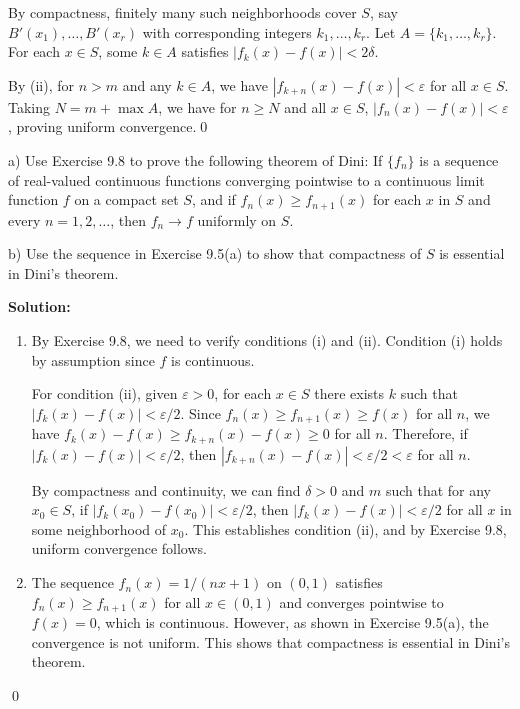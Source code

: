 By compactness, finitely many such neighborhoods cover \( S \), say \( B'(x_1), \ldots, B'(x_r) \) with corresponding integers \( k_1, \ldots, k_r \). Let \( A = \{k_1, \ldots, k_r\} \). For each \( x \in S \), some \( k \in A \) satisfies \( |f_k(x) - f(x)| < 2\delta \).

By (ii), for \( n > m \) and any \( k \in A \), we have \( |f_{k+n}(x) - f(x)| < \varepsilon \) for all \( x \in S \). Taking \( N = m + \max A \), we have for \( n \geq N \) and all \( x \in S \), \( |f_n(x) - f(x)| < \varepsilon \), proving uniform convergence.\qed


\begin{problembox}
a) Use Exercise 9.8 to prove the following theorem of Dini: If \( \{f_n\} \) is a sequence of real-valued continuous functions converging pointwise to a continuous limit function \( f \) on a compact set \( S \), and if \( f_n(x) \geq f_{n+1}(x) \) for each \( x \) in \( S \) and every \( n = 1, 2, \ldots \), then \( f_n \to f \) uniformly on \( S \).

b) Use the sequence in Exercise 9.5(a) to show that compactness of \( S \) is essential in Dini's theorem.
\end{problembox}

\bigskip\noindent\textbf{Solution:}
\begin{enumerate}[label=(\alph*)]
\item By Exercise 9.8, we need to verify conditions (i) and (ii). Condition (i) holds by assumption since \( f \) is continuous.

For condition (ii), given \( \varepsilon > 0 \), for each \( x \in S \) there exists \( k \) such that \( |f_k(x) - f(x)| < \varepsilon/2 \). Since \( f_n(x) \geq f_{n+1}(x) \geq f(x) \) for all \( n \), we have \( f_k(x) - f(x) \geq f_{k+n}(x) - f(x) \geq 0 \) for all \( n \). Therefore, if \( |f_k(x) - f(x)| < \varepsilon/2 \), then \( |f_{k+n}(x) - f(x)| < \varepsilon/2 < \varepsilon \) for all \( n \).

By compactness and continuity, we can find \( \delta > 0 \) and \( m \) such that for any \( x_0 \in S \), if \( |f_k(x_0) - f(x_0)| < \varepsilon/2 \), then \( |f_k(x) - f(x)| < \varepsilon/2 \) for all \( x \) in some neighborhood of \( x_0 \). This establishes condition (ii), and by Exercise 9.8, uniform convergence follows.

\item The sequence \( f_n(x) = 1/(nx + 1) \) on \( (0, 1) \) satisfies \( f_n(x) \geq f_{n+1}(x) \) for all \( x \in (0, 1) \) and converges pointwise to \( f(x) = 0 \), which is continuous. However, as shown in Exercise 9.5(a), the convergence is not uniform. This shows that compactness is essential in Dini's theorem.
\end{enumerate}\qed


